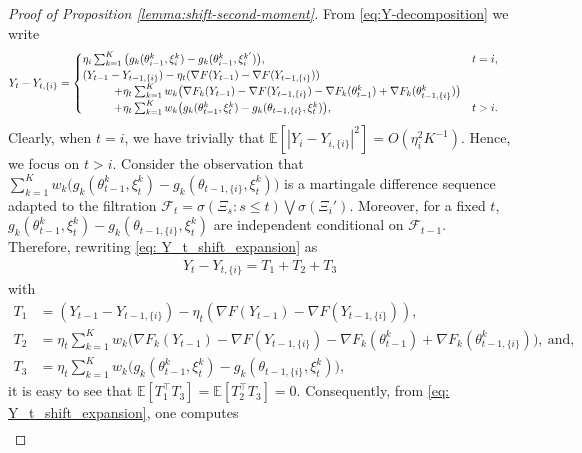 \documentclass[a4paper,11pt]{article}
\numberwithin{equation}{section}
\theoremstyle{plain}
\theoremstyle{remark}
\def\IE{\mathbb{E}}
\newcommand{\shift}[2]{#1_{#2, \{i\}}}
\begin{document}
\begin{proof}[Proof of Proposition \ref{lemma:shift-second-moment}]
  From \eqref{eq:Y-decomposition} we write
\begin{align}
    Y_t -\shift{Y}{t} &= \begin{cases}
        \eta_i \sum_{k=1}^K \big(g_k(\theta_{i-1}^k, \xi_i^k) - g_k(\theta_{i-1}^k, \xi_i^{k'})\big) , &  t=i,  \\
        (Y_{t-1}-  \shift{Y}{t-1}) - \eta_t(\nabla F(Y_{t-1}) - \nabla F(\shift{Y}{t-1})) \\
        \hspace*{1cm}+\eta_t\sum_{k=1}^K w_k \big(\nabla F_k(Y_{t-1}) - \nabla F(\shift{Y}{t-1}) - \nabla F_k(\theta_{t-1}^k) + \nabla F_k(\shift{\theta}{t-1}^k) \big)\\
        \hspace*{1cm}+ \eta_t \sum_{k=1}^K w_k \big( g_k(\theta_{t-1}^k, \xi_t^k) - g_k(\shift{\theta}{t-1}, \xi_t^k) \big), &  t>i . 
    \end{cases} \label{eq: Y_t_shift_expansion}
\end{align}
Clearly, when $t=i$, we have trivially that $\IE[|Y_i - \shift{Y}{i}|^2]=O(\eta_i^2 K^{-1})$. Hence, we focus on $t>i$. Consider the observation that $\sum_{k=1}^K w_k  \big( g_k(\theta_{t-1}^k, \xi_t^k) - g_k(\shift{\theta}{t-1}, \xi_t^k) \big)$ is a martingale difference sequence adapted to the filtration $\mathcal{F}_t=\sigma(\Xi_s: s\leq t) \bigvee \sigma(\Xi_i')$. Moreover, for a fixed $t$, $g_k(\theta_{t-1}^k, \xi_t^k) - g_k(\shift{\theta}{t-1}, \xi_t^k)$ are independent conditional on $\mathcal{F}_{t-1}$. Therefore, rewriting \eqref{eq: Y_t_shift_expansion} as
\begin{align} \label{eqY_t:T1-T2-T3}
    Y_t -\shift{Y}{t} = T_1 +  T_2 +  T_3
\end{align}
with \begin{align*}
    T_1 &=(Y_{t-1}-  \shift{Y}{t-1}) - \eta_t(\nabla F(Y_{t-1}) - \nabla F(\shift{Y}{t-1})), \\
    T_2 &= \eta_t\sum_{k=1}^K w_k \big(\nabla F_k(Y_{t-1}) - \nabla F(\shift{Y}{t-1}) - \nabla F_k(\theta_{t-1}^k) + \nabla F_k(\shift{\theta}{t-1}^k) \big), \ \text{and,} \\
    T_3 &= \eta_t \sum_{k=1}^K w_k \big( g_k(\theta_{t-1}^k, \xi_t^k) - g_k(\shift{\theta}{t-1}, \xi_t^k) \big),
\end{align*}
 it is easy to see that $\IE[T_1^\top T_3]=\IE[T_2^\top T_3]=0$. Consequently, from \eqref{eq: Y_t_shift_expansion}, one computes
 \begin{align} \label{eq:Y-shift-square}

\end{align}
\end{proof}
\end{document}
